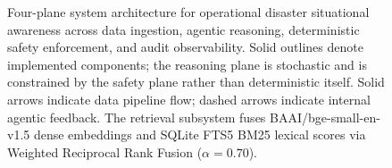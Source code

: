 \documentclass[conference]{IEEEtran}
\begin{document}
\begin{figure}[!t]
{%
}%
\caption{Four-plane system architecture for operational disaster situational awareness across data ingestion, agentic reasoning, deterministic safety enforcement, and audit observability. Solid outlines denote implemented components; the reasoning plane is stochastic and is constrained by the safety plane rather than deterministic itself. Solid arrows indicate data pipeline flow; dashed arrows indicate internal agentic feedback. The retrieval subsystem fuses BAAI/bge-small-en-v1.5 dense embeddings and SQLite FTS5 BM25 lexical scores via Weighted Reciprocal Rank Fusion ($\alpha = 0.70$).}
\label{fig:arch}
\end{figure}
\end{document}
